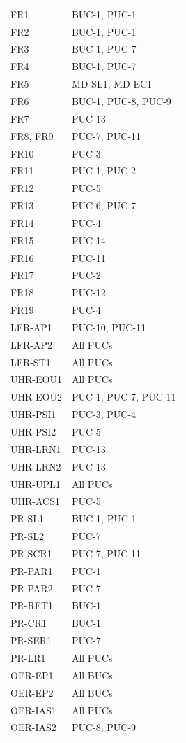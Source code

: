 \documentclass[12pt]{article}
\begin{document}
\begin{longtable}{p{2.5cm}p{11cm}}
  FR1 & BUC-1, PUC-1 \\
  FR2 & BUC-1, PUC-1 \\
  FR3 & BUC-1, PUC-7 \\
  FR4 & BUC-1, PUC-7 \\
  FR5 & MD-SL1, MD-EC1 \\
  FR6 & BUC-1, PUC-8, PUC-9 \\
  FR7 & PUC-13 \\
  FR8, FR9 & PUC-7, PUC-11 \\
  FR10 & PUC-3 \\
  FR11 & PUC-1, PUC-2 \\
  FR12 & PUC-5 \\
  FR13 & PUC-6, PUC-7 \\
  FR14 & PUC-4 \\
  FR15 & PUC-14 \\
  FR16 & PUC-11 \\
  FR17 & PUC-2 \\
  FR18 & PUC-12 \\
  FR19 & PUC-4 \\
  LFR-AP1 & PUC-10, PUC-11 \\
  LFR-AP2 & All PUCs \\
  LFR-ST1 & All PUCs \\
  UHR-EOU1 & All PUCs \\
  UHR-EOU2 & PUC-1, PUC-7, PUC-11 \\
  UHR-PSI1 & PUC-3, PUC-4 \\
  UHR-PSI2 & PUC-5 \\
  UHR-LRN1 & PUC-13 \\
  UHR-LRN2 & PUC-13 \\
  UHR-UPL1 & All PUCs \\
  UHR-ACS1 & PUC-5 \\
  PR-SL1 & BUC-1, PUC-1 \\
  PR-SL2 & PUC-7 \\
  PR-SCR1 & PUC-7, PUC-11 \\
  PR-PAR1 & PUC-1 \\
  PR-PAR2 & PUC-7 \\
  PR-RFT1 & BUC-1 \\
  PR-CR1 & BUC-1 \\
  PR-SER1 & PUC-7 \\
  PR-LR1 & All PUCs \\
  OER-EP1 & All BUCs \\
  OER-EP2 & All BUCs \\
  OER-IAS1 & All PUCs \\
  OER-IAS2 & PUC-8, PUC-9 \\

\end{longtable}
\end{document}
